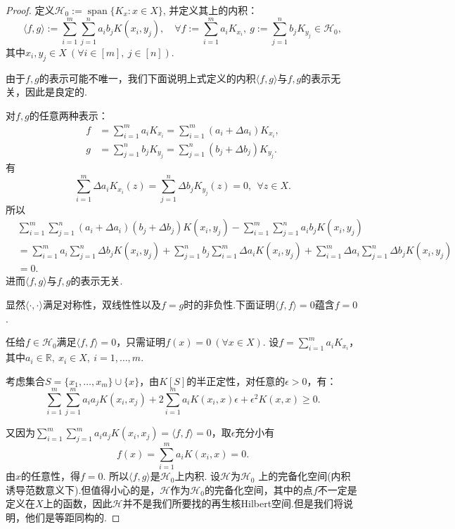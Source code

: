 \documentclass[12pt, a4paper, oneside]{ctexbook}
\begin{document}
\begin{proof}
    定义$\mathcal{H}_0:=\operatorname{span}\{K_x:x\in X\}$, 并定义其上的内积：
    \begin{equation}
        \langle f,g\rangle:=\sum_{i=1}^m\sum_{j=1}^na_ib_jK(x_i,y_j),\quad\forall f:=\sum_{i=1}^ma_iK_{x_i}, ~g:=\sum_{j=1}^nb_jK_{y_j}\in \mathcal{H}_0,
    \end{equation}
    其中$x_i,y_j\in X~(\forall i\in[m],~j\in [n])$.  

    由于$f,g$的表示可能不唯一，我们下面说明上式定义的内积$\langle f,g\rangle$与$f,g$的表示无关，因此是良定的.
    
    对$f,g$的任意两种表示：
    \begin{align*}
        f&=\sum_{i=1}^ma_iK_{x_i}=\sum_{i=1}^m(a_i+\Delta a_i)K_{x_i},\\
        g&=\sum_{j=1}^nb_j K_{y_j}=\sum_{j=1}^n(b_j+\Delta b_j)K_{y_j}.
    \end{align*}
    有
     \begin{equation*}
        \sum_{i=1}^m\Delta a_i  K_{x_i}(z)=\sum_{j=1}^n\Delta b_j  K_{y_j}(z)=0,~~\forall z\in X.
    \end{equation*}
    所以
    \begin{align*}
        &\sum_{i=1}^m\sum_{j=1}^n(a_i+\Delta a_i)(b_j+\Delta b_j)K(x_i,y_j)-\sum_{i=1}^m\sum_{j=1}^na_ib_jK(x_i,y_j)\\
        &=\sum_{i=1}^ma_i\sum_{j=1}^n \Delta b_j K(x_i,y_j)+\sum_{j=1}^n b_j\sum_{i=1}^m\Delta a_i K(x_i,y_j)+\sum_{i=1}^m\Delta a_i\sum_{j=1}^n \Delta b_j K(x_i,y_j)\\
        &=0.
    \end{align*}
    进而$\langle f,g\rangle$与$f,g$的表示无关.

    显然$\langle\cdot,\cdot\rangle$满足对称性，双线性性以及$f=g$时的非负性.下面证明$\langle f,f\rangle=0$蕴含$f=0$.

    任给$f\in \mathcal{H}_0$满足$\langle f,f\rangle=0$，只需证明$f(x)=0~(\forall x\in X)$. 设$f=\sum_{i=1}^m a_i K_{x_i}$，其中$a_i\in\mathbb{R},~x_i\in X,~i=1,\dots,m.$

    考虑集合$S=\{x_1,\dots,x_m\}\cup \{x\}$，由$K[S]$的半正定性，对任意的$\epsilon>0$，有：
    \begin{equation*}
        \sum_{i=1}^m\sum_{j=1}^m a_i a_j K(x_i,x_j)+2\sum_{i=1}^m a_iK(x_i,x)\epsilon+\epsilon^2K(x,x)\geq 0 .
    \end{equation*}

    又因为$\sum_{i=1}^m\sum_{j=1}^m a_i a_j K(x_i,x_j)=\langle f,f\rangle =0$，取$\epsilon$充分小有
    $$f(x)=\sum_{i=1}^m a_iK(x_i,x)=0.$$
    由$x$的任意性，得$f=0$. 所以$\langle f,g \rangle$是$\mathcal{H}_0$上内积. 设$\mathcal{H}$为$\mathcal{H}_0$ 上的完备化空间(内积诱导范数意义下).但值得小心的是，$\mathcal{H}$作为$\mathcal{H}_0$的完备化空间，其中的点$f$不一定是定义在$X$上的函数，因此$\mathcal{H}$并不是我们所要找的再生核Hilbert空间.但是我们将说明，他们是等距同构的.


\end{proof}
\end{document}
